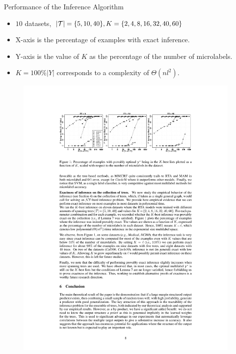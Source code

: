 \documentclass[first=dgreen,second=purple,logo=yellowexc]{aaltoslides}
\begin{document}
%
\begin{frame}{Performance of the Inference Algorithm}
	\begin{itemize}
		\item $10$ datasets, $|\mathcal{T}| = \{5,10,40\}, K=\{2,4,8,16,32,40,60\}$
		\item X-axis is the percentage of examples with exact inference.
		\item Y-axis is the value of $K$ as the percentage of the number of microlabels.
		\item $K=100\%|Y|$ corresponds to a complexity of $\Theta(nl^2)$.
	\end{itemize}
	\begin{figure}
		\begin{center}
			\includegraphics[width=11cm]{./result_plot.pdf}
		\end{center}
	\end{figure}
\end{frame}
\end{document}
